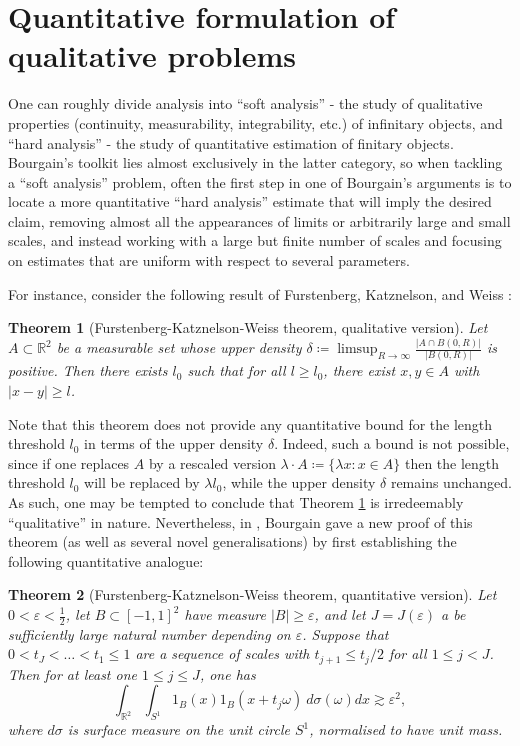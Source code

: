 \documentclass[12pt,a4paper,reqno]{amsart}
\numberwithin{equation}{section}
\theoremstyle{plain}
\newtheorem{theorem}{Theorem}[section]
\theoremstyle{definition}
\newcommand\R{\mathbb{R}}
\newcommand\eps{\varepsilon}
\begin{document}
\section{Quantitative formulation of qualitative problems}\label{quant-sec}

One can roughly divide analysis into ``soft analysis'' - the study of qualitative properties (continuity, measurability, integrability, etc.) of infinitary objects, and ``hard analysis'' - the study of quantitative estimation of finitary objects.  Bourgain's toolkit lies almost exclusively in the latter category, so when tackling a ``soft analysis'' problem, often the first step in one of Bourgain's arguments is to locate a more quantitative ``hard analysis'' estimate that will imply the desired claim, removing almost all the appearances of limits or arbitrarily large and small scales, and instead working with a large but finite number of scales and focusing on estimates that are uniform with respect to several parameters.

For instance, consider the following result of Furstenberg, Katznelson, and Weiss \cite{fkw}:

\begin{theorem}[Furstenberg-Katznelson-Weiss theorem, qualitative version]\label{fkw}  Let $A \subset \R^2$ be a measurable set whose upper density $\delta \coloneqq \limsup_{R \to \infty} \frac{|A \cap B(0,R)|}{|B(0,R)|}$ is positive.  Then there exists $l_0$ such that for all $l \geq l_0$, there exist $x,y \in A$ with $|x-y| \geq l$.
\end{theorem}

Note that this theorem does not provide any quantitative bound for the length threshold $l_0$ in terms of the upper density $\delta$.  Indeed, such a bound is not possible, since if one replaces $A$ by a rescaled version $\lambda \cdot A \coloneqq \{ \lambda x: x \in A \}$ then the length threshold $l_0$ will be replaced by $\lambda l_0$, while the upper density $\delta$ remains unchanged.  As such, one may be tempted to conclude that Theorem \ref{fkw} is irredeemably ``qualitative'' in nature.  Nevertheless, in \cite{density}, Bourgain gave a new proof of this theorem (as well as several novel generalisations) by first establishing the following quantitative analogue:

\begin{theorem}[Furstenberg-Katznelson-Weiss theorem, quantitative version]\label{borg-fkw}  Let $0 < \eps < \frac{1}{2}$, let $B \subset [-1,1]^2$ have measure $|B| \geq \eps$, and let $J = J(\eps)$ a be sufficiently large natural number depending on $\eps$.  Suppose that $0 < t_J < \dots < t_1 \leq 1$ are a sequence of scales with $t_{j+1} \leq t_j/2$ for all $1 \leq j < J$.  Then for at least one $1 \leq j \leq J$, one has
\begin{equation}\label{ar}
 \int_{\R^2} \int_{S^1} 1_B(x) 1_B(x+t_j\omega)\ d\sigma(\omega) dx \gtrsim \eps^2,
\end{equation}
where $d\sigma$ is surface measure on the unit circle $S^1$, normalised to have unit mass.
\end{theorem}
\end{document}
